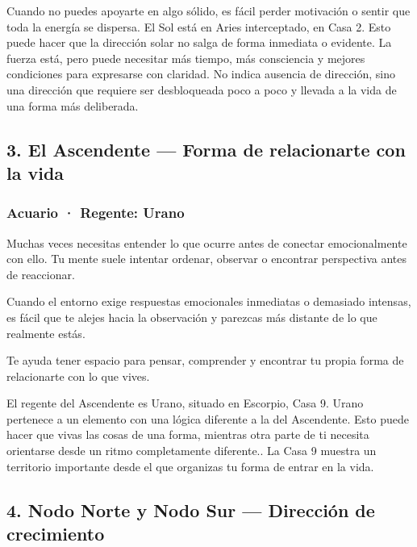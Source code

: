 \documentclass[11pt,a4paper]{article}
\begin{document}
Cuando no puedes apoyarte en algo sólido, es fácil perder motivación o sentir que toda la energía se dispersa.
El Sol está en Aries interceptado, en Casa 2. Esto puede hacer que la dirección solar no salga de forma inmediata o evidente. La fuerza está, pero puede necesitar más tiempo, más consciencia y mejores condiciones para expresarse con claridad. No indica ausencia de dirección, sino una dirección que requiere ser desbloqueada poco a poco y llevada a la vida de una forma más deliberada.

\vspace{0.5cm}


\subsection{3. El Ascendente — Forma de relacionarte con la vida}

\subsubsection*{Acuario · Regente: Urano}

Muchas veces necesitas entender lo que ocurre antes de conectar emocionalmente con ello. Tu mente suele intentar ordenar, observar o encontrar perspectiva antes de reaccionar.

Cuando el entorno exige respuestas emocionales inmediatas o demasiado intensas, es fácil que te alejes hacia la observación y parezcas más distante de lo que realmente estás.

Te ayuda tener espacio para pensar, comprender y encontrar tu propia forma de relacionarte con lo que vives.

El regente del Ascendente es Urano, situado en Escorpio, Casa 9. Urano pertenece a un elemento con una lógica diferente a la del Ascendente. Esto puede hacer que vivas las cosas de una forma, mientras otra parte de ti necesita orientarse desde un ritmo completamente diferente.. La Casa 9 muestra un territorio importante desde el que organizas tu forma de entrar en la vida.

\vspace{0.5cm}


\subsection{4. Nodo Norte y Nodo Sur — Dirección de crecimiento}
\end{document}
